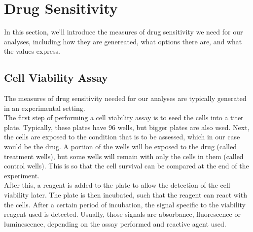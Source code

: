 \section{Drug Sensitivity}\label{sec:drug_sensitivity}
In this section, we'll introduce the measures of drug sensitivity we need for our analyses, including how they are genereated, what options there are, and what the values express.\\

\subsection{Cell Viability Assay}\label{subsec:ds_cell_viability}
The measures of drug sensitivity needed for our analyses are typically generated in an experimental setting.\\
The first step of performing a cell viability assay is to seed the cells into a titer plate. Typically, these plates have 96 wells, but bigger plates are also used. Next, the cells are exposed to the condition that is to be assessed, which in our case would be the drug. A portion of the wells will be exposed to the drug (called treatment wells), but some wells will remain with only the cells in them (called control wells). This is so that the cell survival can be compared at the end of the experiment.\\
After this, a reagent is added to the plate to allow the detection of the cell viability later. The plate is then incubated, such that the reagent can react with the cells. After a certain period of incubation, the signal specific to the viability reagent used is detected. Usually, those signals are absorbance, fluorescence or luminescence, depending on the assay performed and reactive agent used.\\
